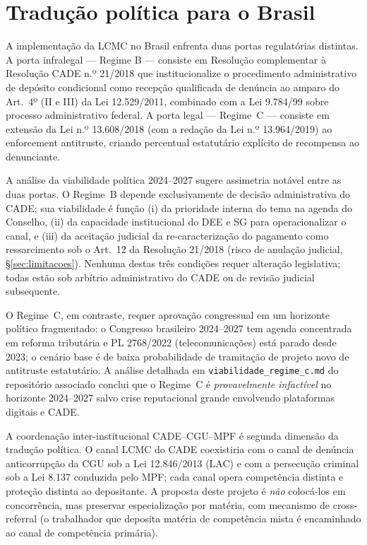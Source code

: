 \documentclass[12pt,a4paper]{article}
\begin{document}
\section{Tradução política para o Brasil}
\label{sec:traducao_politica}

A implementação da LCMC no Brasil enfrenta duas portas regulatórias distintas.
A porta infralegal --- Regime B --- consiste em Resolução complementar à
Resolução CADE n.º 21/2018 que institucionalize o procedimento administrativo
de depósito condicional como recepção qualificada de denúncia ao amparo do
Art.~4º (II e III) da Lei 12.529/2011, combinado com a Lei 9.784/99 sobre
processo administrativo federal. A porta legal --- Regime~C --- consiste em
extensão da Lei n.º 13.608/2018 (com a redação da Lei n.º 13.964/2019) ao
enforcement antitruste, criando percentual estatutário explícito de
recompensa ao denunciante.

A análise da viabilidade política 2024--2027 sugere assimetria notável entre
as duas portas. O Regime~B depende exclusivamente de decisão administrativa
do CADE; sua viabilidade é função (i) da prioridade interna do tema na
agenda do Conselho, (ii) da capacidade institucional do DEE e SG para
operacionalizar o canal, e (iii) da aceitação judicial da
re-caracterização do pagamento como ressarcimento sob o Art.~12 da Resolução
21/2018 (risco de anulação judicial, \S\ref{sec:limitacoes}). Nenhuma destas
três condições requer alteração legislativa; todas estão sob arbítrio
administrativo do CADE ou de revisão judicial subsequente.

O Regime~C, em contraste, requer aprovação congressual em um horizonte
político fragmentado: o Congresso brasileiro 2024--2027 tem agenda
concentrada em reforma tributária e PL 2768/2022 (telecomunicações)
está parado desde 2023; o cenário base é de baixa probabilidade de
tramitação de projeto novo de antitruste estatutário. A análise detalhada
em \texttt{viabilidade\_regime\_c.md} do repositório associado conclui que
o Regime~C é \emph{provavelmente infactível} no horizonte 2024--2027 salvo
crise reputacional grande envolvendo plataformas digitais e CADE.

A coordenação inter-institucional CADE--CGU--MPF é segunda dimensão da
tradução política. O canal LCMC do CADE coexistiria com o canal de
denúncia anticorrupção da CGU sob a Lei 12.846/2013 (LAC) e com a
persecução criminal sob a Lei 8.137 conduzida pelo MPF; cada canal
opera competência distinta e proteção distinta ao depositante. A
proposta deste projeto é \emph{não} colocá-los em concorrência, mas
preservar especialização por matéria, com mecanismo de cross-referral
(o trabalhador que deposita matéria de competência mista é encaminhado
ao canal de competência primária).
\end{document}
